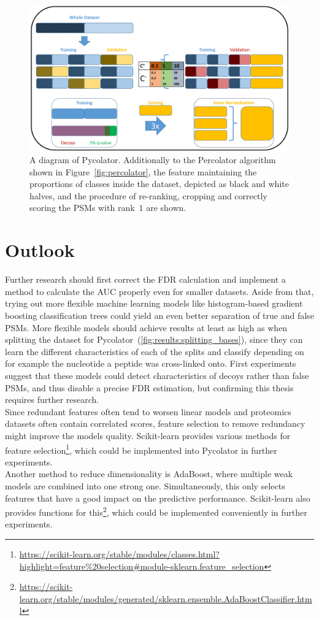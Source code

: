 \renewcommand{\baselinestretch}{0.9}
\begin{figure}
	\normalsize
	\centering
	\includegraphics[width = \textwidth, page = 3]{figures/Pycolator_diagram.pdf}
	\caption[Pycolator scheme]{A diagram of Pycolator. Additionally to the Percolator algorithm shown in Figure~\ref{fig:percolator}, the feature maintaining the proportions of classes inside the dataset, depicted as black and white halves, and the procedure of re-ranking, cropping and correctly scoring the PSMs with rank~$1$ are shown.}
	\label{fig:pycolator}
\end{figure}
\renewcommand{\baselinestretch}{1}
\section{Outlook}
Further research should first correct the FDR calculation and implement a method to calculate the AUC properly even for smaller datasets. Aside from that, trying out more flexible machine learning models like histogram-based gradient boosting classification trees could yield an even better separation of true and false PSMs. More flexible models should achieve results at least as high as when splitting the dataset for Pycolator~(\ref{fig:results:splitting_bases}), since they can learn the different characteristics of each of the splits and classify depending on for example the nucleotide a peptide was cross-linked onto. First experiments suggest that these models could detect characteristics of decoys rather than false PSMs, and thus disable a precise FDR estimation, but confirming this thesis requires further research.\\
Since redundant features often tend to worsen linear models and proteomics datasets often contain correlated scores, feature selection to remove redundancy might improve the models quality. Scikit-learn provides various methods for feature selection\footnote{\url{https://scikit-learn.org/stable/modules/classes.html?highlight=feature\%20selection\#module-sklearn.feature_selection}}, which could be implemented into Pycolator in further experiments.\\
Another method to reduce dimensionality is AdaBoost, where multiple weak models are combined into one strong one. Simultaneously, this only selects features that have a good impact on the predictive performance. Scikit-learn also provides functions for this\footnote{\url{https://scikit-learn.org/stable/modules/generated/sklearn.ensemble.AdaBoostClassifier.html}}, which could be implemented conveniently in further experiments.
